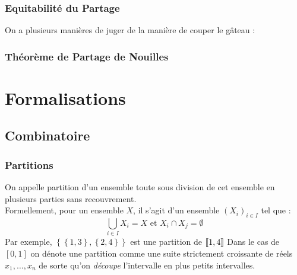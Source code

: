 \documentclass{beamercours}
\begin{document}
\begin{frame}
    \frametitle{Equitabilité du Partage}
    On a plusieurs manières de juger de la manière de couper le gâteau :
    \begin{itemize}
    \end{itemize}
\end{frame}

\begin{frame}
    \frametitle{Théorème de Partage de Nouilles}
\end{frame}

\section{Formalisations}
\subsection{Combinatoire}
\begin{frame}
    \frametitle{Partitions}
     {On appelle partition d'un ensemble toute sous division de cet ensemble en plusieurs parties sans recouvrement.\\}
     {Formellement, pour un ensemble $X$, il s'agit d'un ensemble $(X_{i})_{i\in I}$ tel que :
    \[
        \bigcup_{i\in I}X_{i} = X \text{ et } X_{i} \cap X_{j} = \emptyset
    \]}
     {Par exemple, $\left\{\left\{1, 3\right\}, \left\{2, 4\right\}\right\}$ est une partition de $\left\llbracket 1, 4\right\rrbracket$}
     {Dans le cas de $\left[0, 1\right]$ on dénote une partition comme une suite strictement croissante de réels $x_{1}, \ldots, x_{n}$ de sorte qu'on \textit{découpe} l'intervalle en plus petits intervalles.}
\end{frame}
\end{document}
